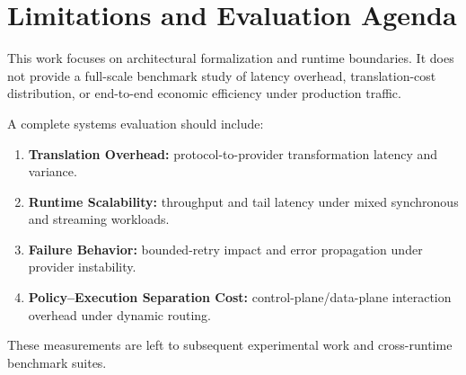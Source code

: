 \section{Limitations and Evaluation Agenda}

This work focuses on architectural formalization and runtime boundaries. It does not provide a full-scale benchmark study of latency overhead, translation-cost distribution, or end-to-end economic efficiency under production traffic.

A complete systems evaluation should include:
\begin{enumerate}[leftmargin=1.5em]
  \item \textbf{Translation Overhead:} protocol-to-provider transformation latency and variance.
  \item \textbf{Runtime Scalability:} throughput and tail latency under mixed synchronous and streaming workloads.
  \item \textbf{Failure Behavior:} bounded-retry impact and error propagation under provider instability.
  \item \textbf{Policy--Execution Separation Cost:} control-plane/data-plane interaction overhead under dynamic routing.
\end{enumerate}

These measurements are left to subsequent experimental work and cross-runtime benchmark suites.
